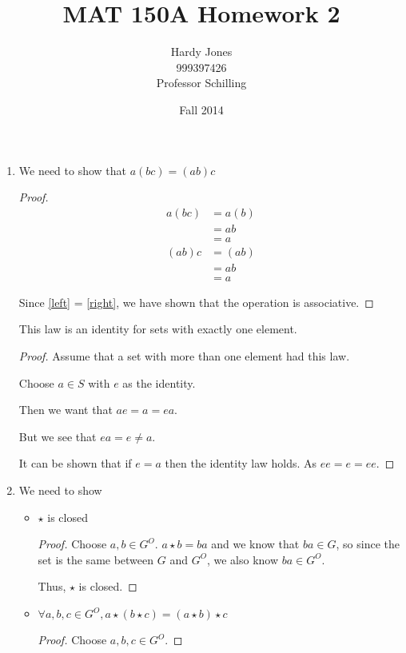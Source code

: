 \documentclass[12pt,letterpaper]{article}
\title{MAT 150A Homework 2\vspace{-2ex}}
\author{Hardy Jones\\
        999397426\\
        Professor Schilling\vspace{-2ex}}
\date{Fall 2014}
\begin{document}
  \maketitle

  \begin{enumerate}
    \item
      We need to show that $a(bc) = (ab)c$

      \begin{proof}
        \begin{align*}
          a(bc) &= a(b) \\
          &= ab \\
          &= a \tag{left} \label{left}
        \end{align*}
        \begin{align*}
          (ab)c &= (ab) \\
          &= ab \\
          &= a \tag{right} \label{right}
        \end{align*}

        Since \ref{left} = \ref{right}, we have shown that the operation is associative.
      \end{proof}

      This law is an identity for sets with exactly one element.

      \begin{proof}
        Assume that a set with more than one element had this law.

        Choose $a \in S$ with $e$ as the identity.

        Then we want that $ae = a = ea$.

        But we see that $ea = e \ne a$.

        It can be shown that if $e = a$ then the identity law holds.
        As $ee = e = ee$.
      \end{proof}
    \item
      We need to show
      \begin{itemize}
        \item $\star$ is closed
          \begin{proof}
            Choose $a, b \in G^O$.
            $a \star b = ba$ and we know that $ba \in G$,
            so since the set is the same between $G$ and $G^O$, we also know $ba \in G^O$.

            Thus, $\star$ is closed.
          \end{proof}
        \item $\forall a, b, c \in G^O, a \star (b \star c) = (a \star b) \star c$
          \begin{proof}
            Choose $a, b, c \in G^O$.


\end{proof}
\end{itemize}
\end{enumerate}
\end{document}
